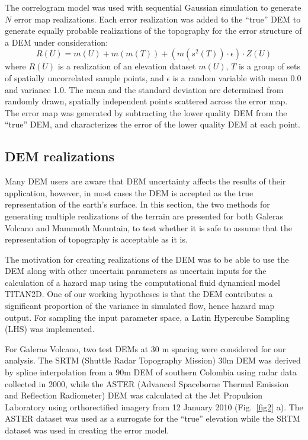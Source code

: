 \documentclass[12pt]{article}
\begin{document}
The correlogram model was used with sequential Gaussian simulation to
generate $N$ error map realizations.  Each error realization was added
to the ``true'' DEM to generate equally probable realizations of the
topography for the error structure of a DEM under consideration:
\begin{equation}
 R(U)=m(U)+m(m(T))+(m(s^2(T))\cdot \epsilon)\cdot Z(U)
\label{eq:one}
\end{equation} 
where $R(U)$ is a realization of an elevation dataset $m(U)$, $T$ is a
group of sets of spatially uncorrelated sample points, and $\epsilon$
is a random variable with mean 0.0 and variance 1.0.  The mean and the
standard deviation are determined from randomly drawn, spatially
independent points scattered across the error map. The error map was
generated by subtracting the lower quality DEM from the ``true'' DEM,
and characterizes the error of the lower quality DEM at each point.

\subsection{DEM realizations}

Many DEM users are aware that DEM uncertainty affects the results of
their application, however, in most cases the DEM is accepted as the
true representation of the earth's surface. In this section, the two
methods for generating multiple realizations of the terrain are
presented for both Galeras Volcano and Mammoth Mountain, to test
whether it is safe to assume that the representation of topography is
acceptable as it is.

The motivation for creating realizations of the DEM was to be able to
use the DEM along with other uncertain parameters as uncertain inputs
for the calculation of a hazard map using the computational fluid
dynamical model TITAN2D.  One of our working hypotheses is that the
DEM contributes a significant proportion of the variance in simulated
flow, hence hazard map output.  For sampling the input parameter
space, a Latin Hypercube Sampling (LHS) was implemented.

For Galeras Volcano, two test DEMs at 30 m spacing were considered for
our analysis. The SRTM (Shuttle Radar Topography Mission) 30m DEM was
derived by spline interpolation from a 90m DEM of southern Colombia
using radar data collected in 2000, while the ASTER (Advanced
Spaceborne Thermal Emission and Reflection Radiometer) DEM was
calculated at the Jet Propulsion Laboratory using orthorectified
imagery from 12 January 2010 (Fig.~\ref{fig2} a).  The ASTER dataset
was used as a surrogate for the ``true'' elevation while the SRTM
dataset was used in creating the error model.
\end{document}
